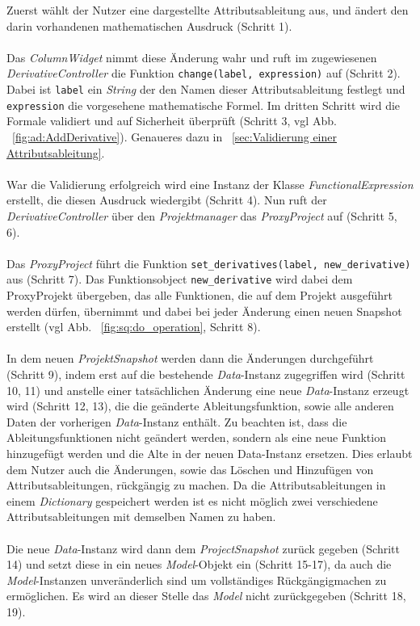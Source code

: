 \documentclass{article}
\begin{document}
Zuerst wählt der Nutzer eine dargestellte Attributsableitung aus, und ändert den darin vorhandenen mathematischen Ausdruck (Schritt 1). \\\\Das \textit{ColumnWidget} nimmt diese Änderung wahr und ruft im zugewiesenen \textit{DerivativeController} die Funktion \texttt{change(label, expression)} auf (Schritt 2). Dabei ist \texttt{label} ein \textit{String} der den Namen dieser Attributsableitung festlegt und \texttt{expression} die vorgesehene mathematische Formel. Im dritten Schritt wird die Formale validiert und auf Sicherheit überprüft (Schritt 3, vgl Abb. ~\ref{fig:ad:AddDerivative}). Genaueres dazu in ~\ref{sec:Validierung einer Attributsableitung}. \\\\
War die Validierung erfolgreich wird eine Instanz der Klasse \textit{FunctionalExpression} erstellt, die diesen Ausdruck wiedergibt (Schritt 4). Nun ruft der \textit{DerivativeController} über den \textit{Projektmanager} das \textit{ProxyProject} auf (Schritt 5, 6).\\\\
Das \textit{ProxyProject} führt die Funktion \texttt{set\_derivatives(label, new\_derivative)} aus (Schritt 7). Das Funktionsobject \texttt{new\_derivative} wird dabei dem ProxyProjekt übergeben, das alle Funktionen, die auf dem Projekt ausgeführt werden dürfen, übernimmt und dabei bei jeder Änderung einen neuen Snapshot erstellt (vgl Abb. ~\ref{fig:sq:do_operation}, Schritt 8).\\\\
In dem neuen \textit{ProjektSnapshot} werden dann die Änderungen durchgeführt (Schritt 9), indem erst auf die bestehende \textit{Data}-Instanz zugegriffen wird (Schritt 10, 11) und anstelle einer tatsächlichen Änderung eine neue \textit{Data}-Instanz erzeugt wird (Schritt 12, 13), die die geänderte Ableitungsfunktion, sowie alle anderen Daten der vorherigen \textit{Data}-Instanz enthält. Zu beachten ist, dass die Ableitungsfunktionen nicht geändert werden, sondern als eine neue Funktion hinzugefügt werden und die Alte in der neuen Data-Instanz ersetzen. Dies erlaubt dem Nutzer auch die Änderungen, sowie das Löschen und Hinzufügen von Attributsableitungen, rückgängig zu machen. Da die Attributsableitungen in einem \textit{Dictionary} gespeichert werden ist es nicht möglich zwei verschiedene Attributsableitungen mit demselben Namen zu haben.\\\\
Die neue \textit{Data}-Instanz wird dann dem \textit{ProjectSnapshot} zurück gegeben (Schritt 14) und setzt diese in ein neues \textit{Model}-Objekt ein (Schritt 15-17), da auch die \textit{Model}-Instanzen unveränderlich sind um vollständiges Rückgängigmachen zu ermöglichen. Es wird an dieser Stelle das \textit{Model} nicht zurückgegeben (Schritt 18, 19).\\\\
\end{document}
